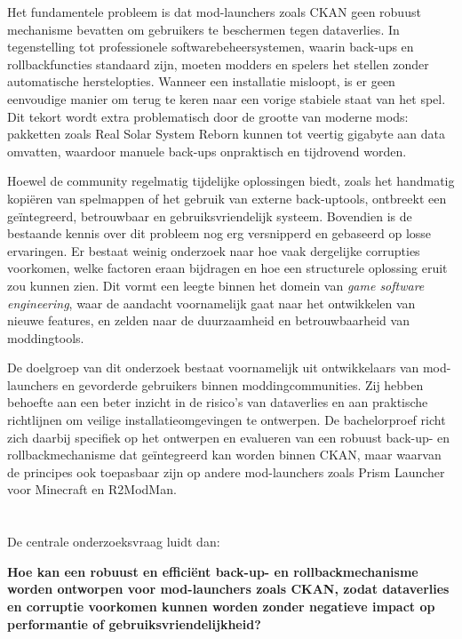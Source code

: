Het fundamentele probleem is dat mod-launchers zoals CKAN geen robuust mechanisme bevatten om gebruikers te beschermen tegen dataverlies. In tegenstelling tot professionele softwarebeheersystemen, waarin back-ups en rollbackfuncties standaard zijn, moeten modders en spelers het stellen zonder automatische herstelopties. Wanneer een installatie misloopt, is er geen eenvoudige manier om terug te keren naar een vorige stabiele staat van het spel. Dit tekort wordt extra problematisch door de grootte van moderne mods: pakketten zoals Real Solar System Reborn kunnen tot veertig gigabyte aan data omvatten, waardoor manuele back-ups onpraktisch en tijdrovend worden.

Hoewel de community regelmatig tijdelijke oplossingen biedt, zoals het handmatig kopiëren van spelmappen of het gebruik van externe back-uptools, ontbreekt een geïntegreerd, betrouwbaar en gebruiksvriendelijk systeem. Bovendien is de bestaande kennis over dit probleem nog erg versnipperd en gebaseerd op losse ervaringen. Er bestaat weinig onderzoek naar hoe vaak dergelijke corrupties voorkomen, welke factoren eraan bijdragen en hoe een structurele oplossing eruit zou kunnen zien. Dit vormt een leegte binnen het domein van \textit{game software engineering}, waar de aandacht voornamelijk gaat naar het ontwikkelen van nieuwe features, en zelden naar de duurzaamheid en betrouwbaarheid van moddingtools.

De doelgroep van dit onderzoek bestaat voornamelijk uit ontwikkelaars van mod-launchers en gevorderde gebruikers binnen moddingcommunities. Zij hebben behoefte aan een beter inzicht in de risico’s van dataverlies en aan praktische richtlijnen om veilige installatieomgevingen te ontwerpen. De bachelorproef richt zich daarbij specifiek op het ontwerpen en evalueren van een robuust back-up- en rollbackmechanisme dat geïntegreerd kan worden binnen CKAN, maar waarvan de principes ook toepasbaar zijn op andere mod-launchers zoals Prism Launcher voor Minecraft en R2ModMan.


\section{}%
\label{sec:onderzoeksvraag}

De centrale onderzoeksvraag luidt dan:

\textbf{Hoe kan een robuust en efficiënt back-up- en rollbackmechanisme worden ontworpen voor mod-launchers zoals CKAN, zodat dataverlies en corruptie voorkomen kunnen worden zonder negatieve impact op performantie of gebruiksvriendelijkheid?}

